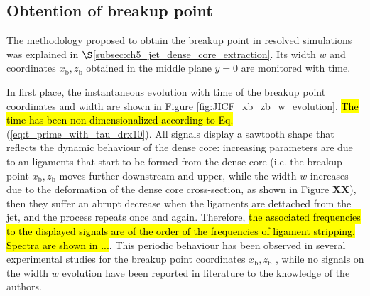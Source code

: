 \subsection{Obtention of breakup point}

The methodology proposed to obtain the breakup point in resolved simulations was explained in $\S$\ref{subsec:ch5_jet_dense_core_extraction}. Its width $w$ and coordinates $x_\mathrm{b}, z_\mathrm{b}$ obtained in the middle plane $y = 0$ are monitored with time. 

In first place, the instantaneous evolution with time of the breakup point coordinates and width are shown in Figure \ref{fig:JICF_xb_zb_w_evolution}. \hl{The time has been non-dimensionalized according to Eq.} (\ref{eq:t_prime_with_tau_drx10}). All signals display a sawtooth shape that reflects the dynamic behaviour of the dense core: increasing parameters are due to an ligaments that start to be formed from the dense core (i.e. the breakup point $x_\mathrm{b}, z_\mathrm{b}$ moves further downstream and upper, while the width $w$ increases due to the deformation of the dense core cross-section, as shown in Figure \textbf{XX}), then they suffer an abrupt decrease when the ligaments are dettached from the jet, and the process repeats once and again. Therefore, \hl{the associated frequencies to the displayed signals are of the order of the frequencies of ligament stripping. Spectra are shown in ...}.  This periodic behaviour has been observed in several experimental studies for the breakup point coordinates $x_\mathrm{b}, z_\mathrm{b}$ , while no signals on the width $w$ evolution have been reported in literature to the knowledge of the authors.


